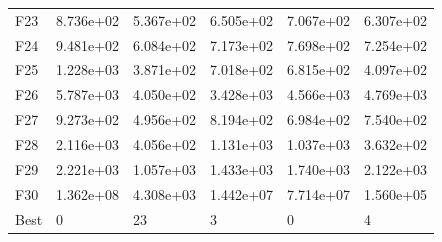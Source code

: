 \begin{tabular}{llllll}
F23  &  8.736e+02 &  5.367e+02 &  6.505e+02 &  7.067e+02 &  6.307e+02 \\
F24  &  9.481e+02 &  6.084e+02 &  7.173e+02 &  7.698e+02 &  7.254e+02 \\
F25  &  1.228e+03 &  3.871e+02 &  7.018e+02 &  6.815e+02 &  4.097e+02 \\
F26  &  5.787e+03 &  4.050e+02 &  3.428e+03 &  4.566e+03 &  4.769e+03 \\
F27  &  9.273e+02 &  4.956e+02 &  8.194e+02 &  6.984e+02 &  7.540e+02 \\
F28  &  2.116e+03 &  4.056e+02 &  1.131e+03 &  1.037e+03 &  3.632e+02 \\
F29  &  2.221e+03 &  1.057e+03 &  1.433e+03 &  1.740e+03 &  2.122e+03 \\
F30  &  1.362e+08 &  4.308e+03 &  1.442e+07 &  7.714e+07 &  1.560e+05 \\
Best &          0 &         23 &          3 &          0 &          4 \\
\bottomrule
\end{tabular}
